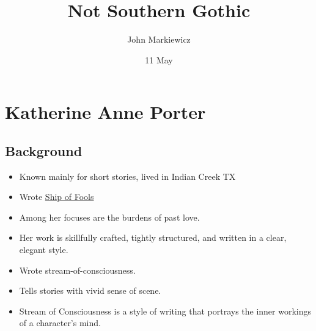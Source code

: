 \documentclass[11pt]{article}
\begin{document}
\title{Not Southern Gothic}
\author{John Markiewicz}
\date{11 May}
\maketitle

\section{Katherine Anne Porter}
\subsection{Background}
\begin{itemize}
	\item Known mainly for short stories, lived in Indian Creek TX
	\item Wrote \underline{Ship of Fools}
	\item Among her focuses are the burdens of past love.
	\item Her work is skillfully crafted, tightly structured, and written in a 
		clear, elegant style.
	\item Wrote stream-of-consciousness.
	\item Tells stories with vivid sense of scene.
	\item Stream of Consciousness is a style of writing that portrays the inner 
		workings of a character's mind.
\end{itemize}
\end{document}

